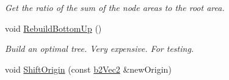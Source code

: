 \begin{DoxyCompactItemize}
\begin{DoxyCompactList}\small\item\em Get the ratio of the sum of the node areas to the root area. \end{DoxyCompactList}\item 
void \hyperlink{classb2_dynamic_tree_abd146017cfec1cf5ea7b87331f30a3ff}{Rebuild\+Bottom\+Up} ()\hypertarget{classb2_dynamic_tree_abd146017cfec1cf5ea7b87331f30a3ff}{}\label{classb2_dynamic_tree_abd146017cfec1cf5ea7b87331f30a3ff}

\begin{DoxyCompactList}\small\item\em Build an optimal tree. Very expensive. For testing. \end{DoxyCompactList}\item 
void \hyperlink{classb2_dynamic_tree_af37ddfed6a5da97d5a78b09918d19ceb}{Shift\+Origin} (const \hyperlink{structb2_vec2}{b2\+Vec2} \&new\+Origin)
\end{DoxyCompactItemize}
